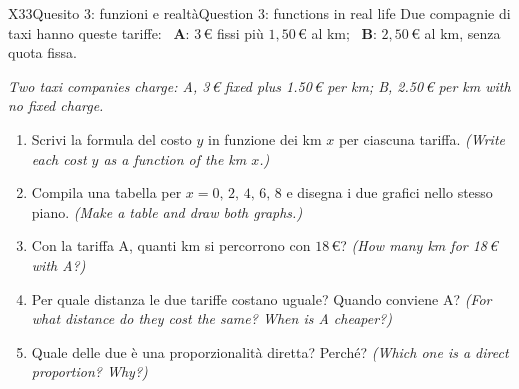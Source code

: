 \documentclass[11pt,a4paper]{article}
\newcommand{\en}[1]{\par{\small\itshape\color{engray}#1\par}}
\newcommand{\enx}[1]{{\small\itshape\color{engray}(#1)}}
\begin{document}
\begin{esercizio}{X3}{3}{Quesito 3: funzioni e realtà}{Question 3: functions in real life}
Due compagnie di taxi hanno queste tariffe: \ \textbf{A}: $3$\,€ fissi più $1,50$\,€ al km; \ \textbf{B}: $2,50$\,€ al km, senza quota fissa.
\en{Two taxi companies charge: A, 3\,€ fixed plus 1.50\,€ per km; B, 2.50\,€ per km with no fixed charge.}
\begin{enumerate}
\item Scrivi la formula del costo $y$ in funzione dei km $x$ per ciascuna tariffa. \enx{Write each cost $y$ as a function of the km $x$.}
\item Compila una tabella per $x=0,\,2,\,4,\,6,\,8$ e disegna i due grafici nello stesso piano. \enx{Make a table and draw both graphs.}
\item Con la tariffa A, quanti km si percorrono con $18$\,€? \enx{How many km for 18\,€ with A?}
\item Per quale distanza le due tariffe costano uguale? Quando conviene A? \enx{For what distance do they cost the same? When is A cheaper?}
\item Quale delle due è una proporzionalità diretta? Perché? \enx{Which one is a direct proportion? Why?}
\end{enumerate}
\end{esercizio}
\end{document}
